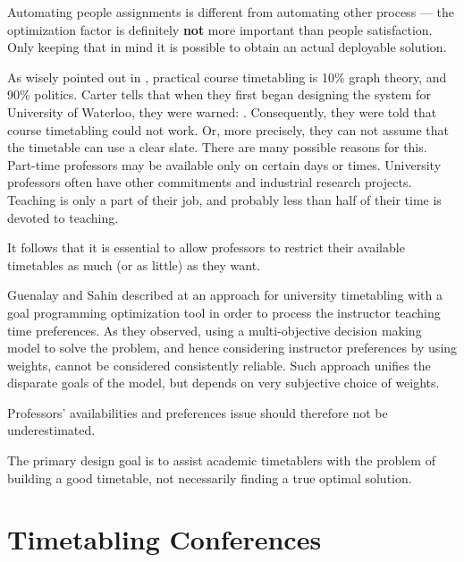 Automating people assignments is different from automating other process --- the optimization factor is definitely \textbf{not} more important than people satisfaction. Only keeping that in mind it is possible to obtain an actual deployable solution.

As wisely pointed out in \cite{Carter2001}, practical course timetabling is 10\% graph theory, and 90\% politics. Carter tells that when they first began designing the system for University of Waterloo, they were warned: . Consequently, they were told that course timetabling could not work. Or, more precisely, they can not assume that the timetable can use a clear slate. There are many possible reasons for this. Part-time professors may be available only on certain days or times. University professors often have other commitments and industrial research projects. Teaching is only a part of their job, and probably less than half of their time is devoted to teaching.

It follows that it is essential to allow professors to restrict their available timetables as much (or as little) as they want.

Guenalay and Sahin described at \cite{Guenalay2006} an approach for university timetabling with a goal programming optimization tool in order to process the instructor teaching time preferences. As they observed, using a multi-objective decision making model to solve the problem, and hence considering instructor preferences by using weights, cannot be considered consistently reliable. Such approach unifies the disparate goals of the model, but depends on very subjective choice of weights.

Professors' availabilities and preferences issue should therefore not be underestimated.


The primary design goal is to assist academic timetablers with the problem of building a good timetable, not necessarily finding a true optimal solution.


\section{Timetabling Conferences}





